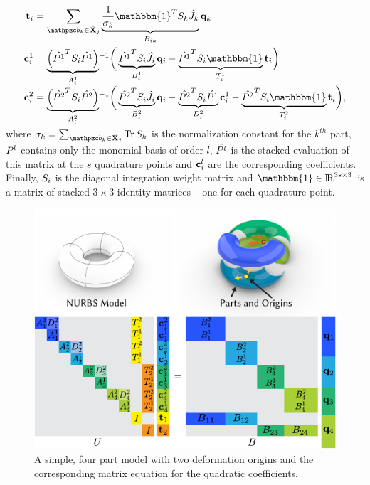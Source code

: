 \begin{equation}
    \begin{split}
\tr_i  & = \sum_{\prt_k \in \bar{\refX}_j} \underbrace{\frac{1}{\sigma_k}\mathbbm{1}^T\wt_k \samp{\Jnurbs}_k}_{B_{ik}}\vc{q}_k \\   
        \vc{c}_i^1 & = \smash{\underbrace{\left(\samp{\Pmat^1}^T\wt_i\samp{\Pmat^1}\right)}_{A^1_i}}^{-1}\bigg(\underbrace{\samp{\Pmat^1}^T\wt_i\samp{\Jnurbs}_i}_{B^1_i}\vc{q}_i-\underbrace{\samp{\Pmat^1}^T\wt_i\mathbbm{1}}_{T^1_i}\tr_i\bigg)\\
        \vc{c}_i^2 & = \smash{\underbrace{\left(\samp{\Pmat^2}^T\wt_i\samp{\Pmat^2}\right)}_{A^2_i}}^{-1}\bigg(\underbrace{\samp{\Pmat^2}^T\wt_i\samp{\Jnurbs}_i}_{B^2_i}\vc{q}_i-\underbrace{\samp{\Pmat^2}^T\wt_i\samp{\Pmat^1}}_{D^2_i}\vc{c}_i^1 - \underbrace{\samp{\Pmat^2}^T\wt_i\mathbbm{1}}_{T^2_i}\tr_i\bigg),
    \end{split}
    \label{eq:hfit} 
\end{equation} where $\sigma_k=\sum_{\prt_k \in \bar{\refX}_j} \Tr \wt_k$ is the normalization constant for the $k^{th}$ part, $P^l$ contains only the monomial basis of order $l$,  $\hat{P^l}$ is the stacked evaluation of this matrix at the $s$ quadrature points and $\mathbf{c}^l_i$ are the corresponding coefficients. 
Finally, $S_i$ is the diagonal integration weight matrix and $\mathbbm{1}\in\real^{3s\times3}$ is a matrix of stacked $3\times3$ identity matrices -- one for each quadrature point.

\begin{figure}[h]
    \includegraphics[width=\columnwidth]{figures/projection_operator_solve}
    \caption{A simple, four part model with two deformation origins and the corresponding matrix equation for the quadratic coefficients.}
    \label{fig:multiparts}
\end{figure}

